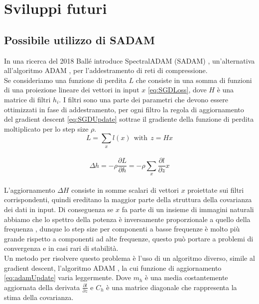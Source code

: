 \chapter{Sviluppi futuri}

\section{Possibile utilizzo di SADAM}

In una ricerca del 2018 Ballé introduce SpectralADAM (SADAM) \cite{balle2018efficient}, un'alternativa all’algoritmo ADAM \cite{kingma2014adam}, per l’addestramento di reti di compressione.\\
Se consideriamo una funzione di perdita $L$ che consiste in una somma di funzioni di una proiezione lineare dei vettori in input $x$ \ref{eq:SGDLoss}, dove $H$ è una matrice di filtri $h_{i}$. I filtri sono una parte dei parametri che devono essere ottimizzati in fase di addestramento, per ogni filtro la regola di aggiornamento del gradient descent \ref{eq:SGDUpdate} sottrae il gradiente della funzione di perdita moltiplicato per lo step size $\rho$.\\
\begin{equation}\label{eq:SGDLoss}
L = \sum_{x} l(x) \:\: \textrm{with} \:\: z = Hx
\end{equation}\\
\begin{equation}\label{eq:SGDUpdate}
\Delta h = - \rho \dfrac{\partial L}{\partial h} = - \rho \sum_{x} \dfrac{\partial l}{\partial z} x
\end{equation}\\
L’aggiornamento $\Delta H$ consiste in somme scalari di vettori $x$ proiettate sui filtri corrispondenti, quindi ereditano la maggior parte della struttura della covarianza dei dati in input. Di conseguenza se $x$ fa parte di un insieme di immagini naturali abbiamo che lo spettro della potenza è inversamente proporzionale a quello della frequenza \cite{field1987relations}, dunque lo step size per componenti a basse frequenze è molto più grande rispetto a componenti ad alte frequenze, questo può portare a problemi di convergenza e in casi rari di stabilità.\\
Un metodo per risolvere questo problema è l’uso di un algoritmo diverso, simile al gradient descent, l’algoritmo ADAM \cite{kingma2014adam}, la cui funzione di aggiornamento \ref{eq:adamUpdate} varia leggermente. Dove $m_{h}$ è una media costantemente aggiornata della derivata $\tfrac{\partial l}{\partial z}$ e $C_{h}$ è una matrice diagonale che rappresenta la stima della covarianza.\\
